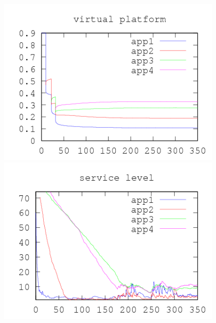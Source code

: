 \documentclass[nobiblatex]{LTHthesis}
\begin{document}
\begin{figure}[th]
\centering
  \begin{minipage}{0.49\textwidth}
  \centering
  \includegraphics[width=\textwidth]{"tools/plot/logs/test2/vp"}
  \end{minipage}
  \hfill
  \begin{minipage}{0.49\textwidth}
  \centering
  \includegraphics[width=\textwidth]{"tools/plot/logs/test2/sl"}
  \end{minipage}
  \begin{minipage}{0.49\textwidth}
  \centering

\end{minipage}
\end{figure}
\end{document}
